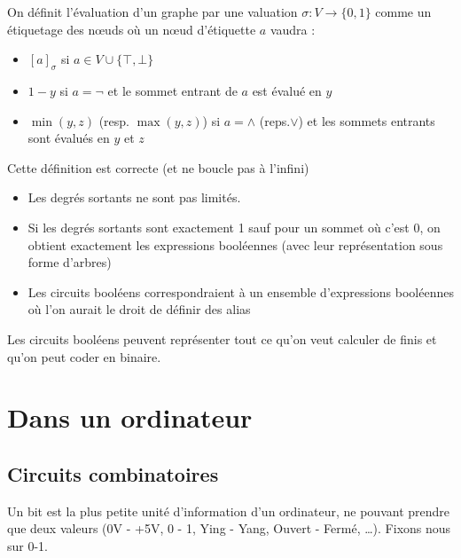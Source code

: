 \begin{definition}
	On définit l'évaluation d'un graphe par une valuation $\sigma :V \to \{0,1\}$ comme un étiquetage des nœuds où un nœud d'étiquette $a$ vaudra : \begin{itemize}[label=$\bullet$]
		\item $[a]_\sigma$ si $a \in V \cup \{\top, \bot\}$
		\item $1-y$ si $a = \neg$ et le sommet entrant de $a$ est évalué en $y$
		\item $\min(y, z)$ (resp. $\max(y, z)$) si $a= \wedge$ (reps.$\vee$) et les sommets entrants sont évalués en $y$ et $z$
	\end{itemize}
\end{definition}

\begin{proposition}
	Cette définition est correcte (et ne boucle pas à l'infini)
\end{proposition}

\begin{rem}
	\begin{itemize}[label=$\bullet$]
		\item Les degrés sortants ne sont pas limités.
		\item Si les degrés sortants sont exactement 1 sauf pour un sommet où c'est 0, on obtient exactement les expressions booléennes (avec leur représentation sous forme d'arbres)
		\item Les circuits booléens correspondraient à un ensemble d'expressions booléennes où l'on aurait le droit de définir des alias
	\end{itemize}
\end{rem}

\begin{personalise}[Conclusion]
	Les circuits booléens peuvent représenter tout ce qu'on veut calculer de finis et qu'on peut coder en binaire.
\end{personalise}

\section{Dans un ordinateur}

\subsection{Circuits combinatoires}

\begin{definition}
	Un bit est la plus petite unité d'information d'un ordinateur, ne pouvant prendre que deux valeurs (0V - +5V, 0 - 1, Ying - Yang, Ouvert - Fermé, \dots). Fixons nous sur 0-1.
\end{definition}

